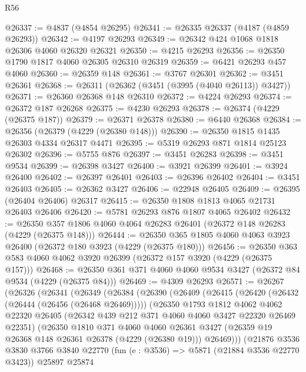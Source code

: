 \begin{lexlean}{R56}
\begin{coremodule}
@26337 := @4837 (@4854 @26295)
@26341 := @26335 @26337 (@4187 (@4859 @26293))
@26342 := @4197 @26293
@26349 := @26342 @424 @1068 @1818 @26306 @4060 @26320 @26321
@26350 := @4215 @26293
@26356 := @26350 @1790 @1817 @4060 @26305 @26310 @26319
@26359 := @6421 @26293 @457 @4060
@26360 := @26359 @148
@26361 := @3767 @26301
@26362 := @3451 @26361
@26368 := @26311 (@26362 (@3451 (@3995 (@4040 @26113)) @3427))
@26371 := @26360 @26368 @148 @26310
@26372 := @4224 @26293
@26374 := @26372 @187 @26268
@26375 := @4230 @26293
@26378 := @26374 (@4229 (@26375 @187))
@26379 := @26371 @26378
@26380 := @6440 @26368
@26384 := @26356 (@26379 (@4229 (@26380 @148)))
@26390 := @26350 @1815 @1435 @26303 @4334 @26317 @4471
@26395 := @5319 @26293 @871 @1814 @25123 @26302
@26396 := @5755 @876
@26397 := @3451 @26283
@26398 := @3451 @9534
@26399 := @26398 @3427
@26400 := @3921 @26399
@26401 := @3924 @26400
@26402 := @26397 @26401
@26403 := @26396 @26402
@26404 := @3451 @26403
@26405 := @26362 @3427
@26406 := @22948 @26405
@26409 := @26395 (@26404 @26406) @26317
@26415 := @26350 @1808 @1813 @4065 @21731 @26403 @26406
@26420 := @5781 @26293 @876 @1807 @4065 @26402
@26432 := @26350 @357 @1806 @4060 @4064 @26283 @26401 (@26372 @148 @26283 (@4229 (@26375 @148)))
@26444 := @26350 @365 @1805 @4060 @4063 @3923 @26400 (@26372 @180 @3923 (@4229 (@26375 @180)))
@26456 := @26350 @363 @583 @4060 @4062 @3920 @26399 (@26372 @157 @3920 (@4229 (@26375 @157)))
@26468 := @26350 @361 @371 @4060 @4060 @9534 @3427 (@26372 @84 @9534 (@4229 (@26375 @84)))
@26469 := @4309 @26293
@26571 := @26267
    (@26326
      (@26341
        (@26349
          (@26384
            (@26390
              (@26409
                (@26415
                  (@26420 (@26432 (@26444 (@26456 (@26468 @26469)))))
                  (@26350
                    @1793
                    @1812
                    @4062
                    @4062
                    @22320
                    @26405
                    (@26342 @439 @212 @371 @4060 @4060 @3427 @22320 @26469 @22351)
                    (@26350
                      @1810
                      @371
                      @4060
                      @4060
                      @26361
                      @3427
                      (@26359 @19 @26368 @148 @26361 @26378 (@4229 (@26380 @19)))
                      @26469)))
                (@21876
                  @3536
                  @3830
                  @3766
                  @3840
                  @22770
                  (fun (e : @3536) => @5871 (@21884 @3536 @22770 @3423))
                  @25897
                  @25874

\end{coremodule}
\end{lexlean}
